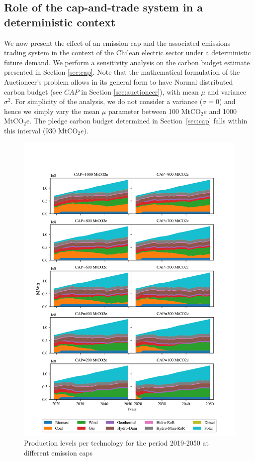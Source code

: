 \documentclass[11pt, letterpaper]{article}
\begin{document}
\subsection{Role of the cap-and-trade system in a deterministic context}\label{sec:deterministic}

We now present the effect of an emission cap and the associated emissions trading system in the context of the Chilean electric sector under a deterministic future demand. We perform a sensitivity analysis on the carbon budget estimate presented in Section  \ref{sec:cap}. Note that the mathematical formulation of the Auctioneer's problem allows in its general form to have Normal distributed carbon budget (see $CAP$ in Section \ref{sec:auctioneer}), with mean $\mu$ and variance $\sigma^2$. For simplicity of the analysis, we do not consider a variance ($\sigma=0$) and hence we simply vary the mean $\mu$ parameter between  100 MtCO$_2e$ and 1000 MtCO$_2$e. The pledge carbon budget determined in Section~\ref{sec:cap} falls within this interval (930 MtCO$_2e$).

\smallskip

\begin{figure}[hbtp]
\includegraphics[height=\textheight]{draft_paper/Figures/Q_second_cap.png}
 \caption{Production levels per technology for the period 2019-2050 at different emission caps}
  \label{fig:prod_cap}
\end{figure}
  
\end{document}
